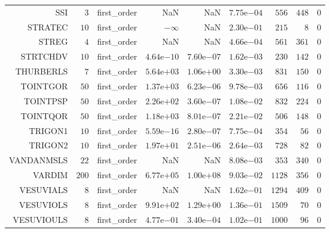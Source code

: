 \begin{longtable}{rrrrrrrrr}
SSI & \(     3\) & first\_order &       NaN &       NaN & \( 7.75\)e\(-04\) & \(   556\) & \(   448\) & \(     0\) \\
STRATEC & \(    10\) & first\_order & \(-\infty\) &       NaN & \( 2.30\)e\(-01\) & \(   215\) & \(     8\) & \(     0\) \\
STREG & \(     4\) & first\_order &       NaN &       NaN & \( 4.66\)e\(-04\) & \(   561\) & \(   361\) & \(     0\) \\
STRTCHDV & \(    10\) & first\_order & \( 4.64\)e\(-10\) & \( 7.60\)e\(-07\) & \( 1.62\)e\(-03\) & \(   230\) & \(   142\) & \(     0\) \\
THURBERLS & \(     7\) & first\_order & \( 5.64\)e\(+03\) & \( 1.06\)e\(+00\) & \( 3.30\)e\(-03\) & \(   831\) & \(   150\) & \(     0\) \\
TOINTGOR & \(    50\) & first\_order & \( 1.37\)e\(+03\) & \( 6.23\)e\(-06\) & \( 9.78\)e\(-03\) & \(   656\) & \(   116\) & \(     0\) \\
TOINTPSP & \(    50\) & first\_order & \( 2.26\)e\(+02\) & \( 3.60\)e\(-07\) & \( 1.08\)e\(-02\) & \(   832\) & \(   224\) & \(     0\) \\
TOINTQOR & \(    50\) & first\_order & \( 1.18\)e\(+03\) & \( 8.01\)e\(-07\) & \( 2.21\)e\(-02\) & \(   506\) & \(   148\) & \(     0\) \\
TRIGON1 & \(    10\) & first\_order & \( 5.59\)e\(-16\) & \( 2.80\)e\(-07\) & \( 7.75\)e\(-04\) & \(   354\) & \(    56\) & \(     0\) \\
TRIGON2 & \(    10\) & first\_order & \( 1.97\)e\(+01\) & \( 2.51\)e\(-06\) & \( 2.64\)e\(-03\) & \(   728\) & \(    82\) & \(     0\) \\
VANDANMSLS & \(    22\) & first\_order &       NaN &       NaN & \( 8.08\)e\(-03\) & \(   353\) & \(   340\) & \(     0\) \\
VARDIM & \(   200\) & first\_order & \( 6.77\)e\(+05\) & \( 1.00\)e\(+08\) & \( 9.03\)e\(-02\) & \(  1128\) & \(   356\) & \(     0\) \\
VESUVIALS & \(     8\) & first\_order &       NaN &       NaN & \( 1.62\)e\(-01\) & \(  1294\) & \(   409\) & \(     0\) \\
VESUVIOLS & \(     8\) & first\_order & \( 9.91\)e\(+02\) & \( 1.29\)e\(+00\) & \( 1.36\)e\(-01\) & \(  1509\) & \(    70\) & \(     0\) \\
VESUVIOULS & \(     8\) & first\_order & \( 4.77\)e\(-01\) & \( 3.40\)e\(-04\) & \( 1.02\)e\(-01\) & \(  1000\) & \(    96\) & \(     0\) \\

\end{longtable}
